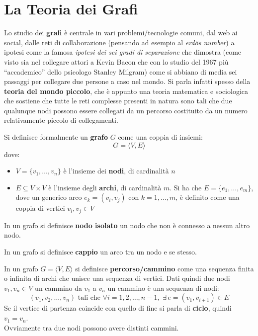 \documentclass[a4paper,12pt, oneside]{book}
\begin{document}
\section{La Teoria dei Grafi}
Lo studio dei \textbf{grafi} è centrale in vari problemi/tecnologie comuni,
dal web ai social, dalle reti di collaborazione (pensando ad esempio al
\textit{erd\"{o}s number}) a ipotesi come la famosa
\textit{ipotesi dei sei gradi di separazione} che dimostra (come visto sia nel
collegare attori a Kevin Bacon che con lo studio del 1967 più ``accademico''
dello psicologo Stanley Milgram)
come si abbiano di media sei passaggi per collegare due persone a caso nel
mondo. Si parla infatti spesso della \textbf{teoria del mondo piccolo}, che è
appunto una teoria matematica e sociologica che sostiene che tutte le reti
complesse presenti in natura sono tali che due qualunque nodi possono essere
collegati da un percorso costituito da un numero relativamente piccolo di
collegamenti.
\begin{definizione}
  Si definisce formalmente un \textbf{grafo} $G$ come una coppia di insiemi:
  \[G=\langle V, E\rangle\]
  dove:
  \begin{itemize}
    \item $V=\{v_1,\ldots,v_n\}$ è l'insieme dei \textbf{nodi}, di cardinalità
    $n$ 
    \item $E\subseteq V\times V$ è l'insieme degli \textbf{archi}, di
    cardinalità $m$. Si ha che $E=\{e_1,\ldots,e_m\}$, dove un generico arco
    $e_k=(v_i,v_j)$ con $k=1,\ldots,m$, è definito come una coppia di vertici
    $v_i,v_j\in V$ 
  \end{itemize}
\end{definizione}
\begin{definizione}
  In un grafo si definisce \textbf{nodo isolato} un nodo che non è connesso a
  nessun altro nodo. 
\end{definizione}
\begin{definizione}
  In un grafo si definisce \textbf{cappio} un arco tra un nodo e se stesso.
\end{definizione}
\begin{definizione}
  In un grafo $G=\langle V,E\rangle$ si definisce \textbf{percorso/cammino} come
  una sequenza finita o infinita 
  di archi che unisce una sequenza di vertici. Dati quindi due nodi $v_1,v_n\in
  V$ un cammino da $v_1$ a $v_n$ un cammino è una sequenza di nodi: 
  \[(v_1,v_2, \ldots, v_n) \mbox{ tali che }\forall i =1,2,\ldots,
    n-1,\,\,\exists \,e=(v_1, v_{i+1})\in E\]
  Se il vertice di partenza coincide con quello di fine si parla di
  \textbf{ciclo}, quindi $v_1=v_n$. \\
  Ovviamente tra due nodi possono avere distinti cammini.
\end{definizione}
\end{document}
